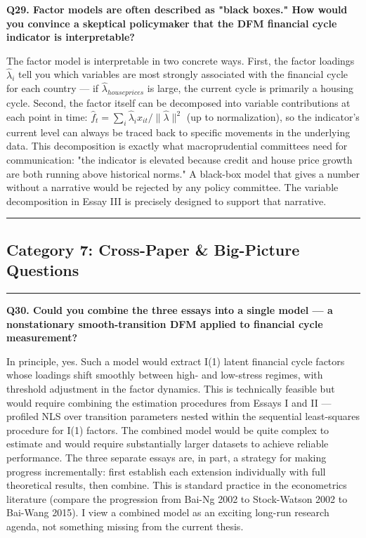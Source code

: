 \documentclass[11pt,a4paper]{article}
\begin{document}
\textbf{Q29. Factor models are often described as "black boxes." How would you convince a skeptical policymaker that the DFM financial cycle indicator is interpretable?}

The factor model is interpretable in two concrete ways. First, the factor loadings $\hat{\lambda}_i$ tell you which variables are most strongly associated with the financial cycle for each country — if $\hat{\lambda}_{house prices}$ is large, the current cycle is primarily a housing cycle. Second, the factor itself can be decomposed into variable contributions at each point in time: $\hat{f}_t = \sum_i \hat{\lambda}_i x_{it} / \|\hat{\lambda}\|^2$ (up to normalization), so the indicator's current level can always be traced back to specific movements in the underlying data. This decomposition is exactly what macroprudential committees need for communication: "the indicator is elevated because credit and house price growth are both running above historical norms." A black-box model that gives a number without a narrative would be rejected by any policy committee. The variable decomposition in Essay III is precisely designed to support that narrative.

\medskip\hrule\medskip

\subsection*{Category 7: Cross-Paper \& Big-Picture Questions}

\medskip\hrule\medskip

\textbf{Q30. Could you combine the three essays into a single model — a nonstationary smooth-transition DFM applied to financial cycle measurement?}

In principle, yes. Such a model would extract I(1) latent financial cycle factors whose loadings shift smoothly between high- and low-stress regimes, with threshold adjustment in the factor dynamics. This is technically feasible but would require combining the estimation procedures from Essays I and II — profiled NLS over transition parameters nested within the sequential least-squares procedure for I(1) factors. The combined model would be quite complex to estimate and would require substantially larger datasets to achieve reliable performance. The three separate essays are, in part, a strategy for making progress incrementally: first establish each extension individually with full theoretical results, then combine. This is standard practice in the econometrics literature (compare the progression from Bai-Ng 2002 to Stock-Watson 2002 to Bai-Wang 2015). I view a combined model as an exciting long-run research agenda, not something missing from the current thesis.
\end{document}
